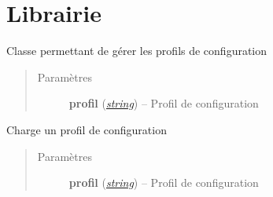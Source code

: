 \documentclass[letterpaper,10pt,french]{sphinxmanual}
\begin{document}
\begin{fulllineitems}
\label{profils:profils.prod.constantes.constantes}
\end{fulllineitems}



\section{Librairie}
\label{profils:librairie}\label{profils:module-lib.conf}

\begin{fulllineitems}
\label{profils:lib.conf.Conf}
Classe permettant de gérer les profils de configuration
\begin{quote}\begin{description}
\item[{Paramètres}] \leavevmode
\textbf{profil} (\href{http://docs.python.org/library/string.html\#module-string}{\emph{string}}) -- Profil de configuration

\end{description}\end{quote}

\begin{fulllineitems}
\label{profils:lib.conf.Conf.importer_profil}
Charge un profil de configuration
\begin{quote}\begin{description}
\item[{Paramètres}] \leavevmode
\textbf{profil} (\href{http://docs.python.org/library/string.html\#module-string}{\emph{string}}) -- Profil de configuration

\end{description}\end{quote}

\end{fulllineitems}


\end{fulllineitems}
\end{document}
